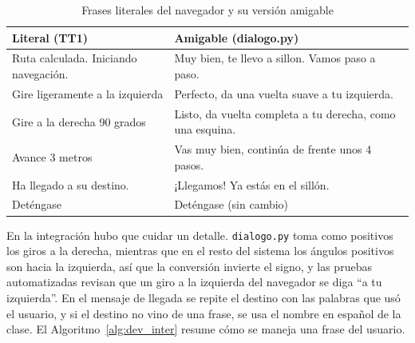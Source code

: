 \begin{table}[H]
\centering
\caption{Frases literales del navegador y su versión amigable}
\label{tab:inter_frases}
\renewcommand{\arraystretch}{1.25}
\begin{tabular}{|p{5.2cm}|p{9.3cm}|}
\hline
\textbf{Literal (TT1)} & \textbf{Amigable (dialogo.py)} \\
\hline
Ruta calculada. Iniciando navegación. & Muy bien, te llevo a sillon. Vamos paso a
paso. \\
\hline
Gire ligeramente a la izquierda & Perfecto, da una vuelta suave a tu izquierda. \\
\hline
Gire a la derecha 90 grados & Listo, da vuelta completa a tu derecha, como una
esquina. \\
\hline
Avance 3 metros & Vas muy bien, continúa de frente unos 4 pasos. \\
\hline
Ha llegado a su destino. & ¡Llegamos! Ya estás en el sillón. \\
\hline
Deténgase & Deténgase (sin cambio) \\
\hline
\end{tabular}
\end{table}

En la integración hubo que cuidar un detalle. \texttt{dialogo.py} toma como positivos los
giros a la derecha, mientras que en el resto del sistema los ángulos positivos son hacia
la izquierda, así que la conversión invierte el signo, y las pruebas automatizadas
revisan que un giro a la izquierda del navegador se diga ``a tu izquierda''. En el
mensaje de llegada se repite el destino con las palabras que usó el usuario, y si el
destino no vino de una frase, se usa el nombre en español de la clase. El Algoritmo~\ref{alg:dev_inter} resume cómo se maneja una frase del usuario.

